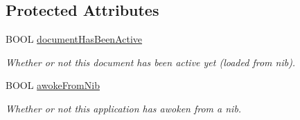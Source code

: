 \subsection*{Protected Attributes}
\begin{DoxyCompactItemize}
\item 
BOOL \hyperlink{interface_g_d_document_ab89b49ec7008a1b538d72bff8a142a8e}{documentHasBeenActive}
\begin{DoxyCompactList}\small\item\em Whether or not this document has been active yet (loaded from nib). \item\end{DoxyCompactList}\item 
\hypertarget{interface_g_d_document_a9a7c41830ef5a9c0e42caf9e4597c107}{
BOOL \hyperlink{interface_g_d_document_a9a7c41830ef5a9c0e42caf9e4597c107}{awokeFromNib}}
\label{interface_g_d_document_a9a7c41830ef5a9c0e42caf9e4597c107}

\begin{DoxyCompactList}\small\item\em Whether or not this application has awoken from a nib. \item\end{DoxyCompactList}\end{DoxyCompactItemize}
